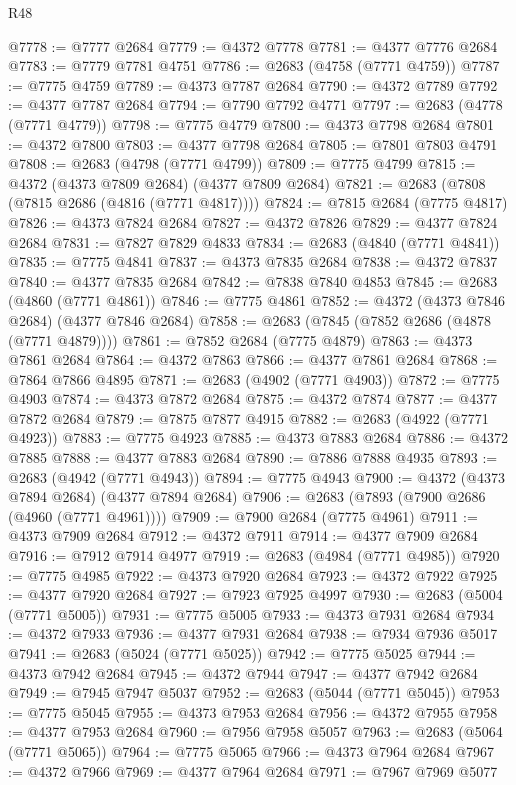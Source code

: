 \begin{lexlean}{R48}
\begin{coremodule}
@7778 := @7777 @2684
@7779 := @4372 @7778
@7781 := @4377 @7776 @2684
@7783 := @7779 @7781 @4751
@7786 := @2683 (@4758 (@7771 @4759))
@7787 := @7775 @4759
@7789 := @4373 @7787 @2684
@7790 := @4372 @7789
@7792 := @4377 @7787 @2684
@7794 := @7790 @7792 @4771
@7797 := @2683 (@4778 (@7771 @4779))
@7798 := @7775 @4779
@7800 := @4373 @7798 @2684
@7801 := @4372 @7800
@7803 := @4377 @7798 @2684
@7805 := @7801 @7803 @4791
@7808 := @2683 (@4798 (@7771 @4799))
@7809 := @7775 @4799
@7815 := @4372 (@4373 @7809 @2684) (@4377 @7809 @2684)
@7821 := @2683 (@7808 (@7815 @2686 (@4816 (@7771 @4817))))
@7824 := @7815 @2684 (@7775 @4817)
@7826 := @4373 @7824 @2684
@7827 := @4372 @7826
@7829 := @4377 @7824 @2684
@7831 := @7827 @7829 @4833
@7834 := @2683 (@4840 (@7771 @4841))
@7835 := @7775 @4841
@7837 := @4373 @7835 @2684
@7838 := @4372 @7837
@7840 := @4377 @7835 @2684
@7842 := @7838 @7840 @4853
@7845 := @2683 (@4860 (@7771 @4861))
@7846 := @7775 @4861
@7852 := @4372 (@4373 @7846 @2684) (@4377 @7846 @2684)
@7858 := @2683 (@7845 (@7852 @2686 (@4878 (@7771 @4879))))
@7861 := @7852 @2684 (@7775 @4879)
@7863 := @4373 @7861 @2684
@7864 := @4372 @7863
@7866 := @4377 @7861 @2684
@7868 := @7864 @7866 @4895
@7871 := @2683 (@4902 (@7771 @4903))
@7872 := @7775 @4903
@7874 := @4373 @7872 @2684
@7875 := @4372 @7874
@7877 := @4377 @7872 @2684
@7879 := @7875 @7877 @4915
@7882 := @2683 (@4922 (@7771 @4923))
@7883 := @7775 @4923
@7885 := @4373 @7883 @2684
@7886 := @4372 @7885
@7888 := @4377 @7883 @2684
@7890 := @7886 @7888 @4935
@7893 := @2683 (@4942 (@7771 @4943))
@7894 := @7775 @4943
@7900 := @4372 (@4373 @7894 @2684) (@4377 @7894 @2684)
@7906 := @2683 (@7893 (@7900 @2686 (@4960 (@7771 @4961))))
@7909 := @7900 @2684 (@7775 @4961)
@7911 := @4373 @7909 @2684
@7912 := @4372 @7911
@7914 := @4377 @7909 @2684
@7916 := @7912 @7914 @4977
@7919 := @2683 (@4984 (@7771 @4985))
@7920 := @7775 @4985
@7922 := @4373 @7920 @2684
@7923 := @4372 @7922
@7925 := @4377 @7920 @2684
@7927 := @7923 @7925 @4997
@7930 := @2683 (@5004 (@7771 @5005))
@7931 := @7775 @5005
@7933 := @4373 @7931 @2684
@7934 := @4372 @7933
@7936 := @4377 @7931 @2684
@7938 := @7934 @7936 @5017
@7941 := @2683 (@5024 (@7771 @5025))
@7942 := @7775 @5025
@7944 := @4373 @7942 @2684
@7945 := @4372 @7944
@7947 := @4377 @7942 @2684
@7949 := @7945 @7947 @5037
@7952 := @2683 (@5044 (@7771 @5045))
@7953 := @7775 @5045
@7955 := @4373 @7953 @2684
@7956 := @4372 @7955
@7958 := @4377 @7953 @2684
@7960 := @7956 @7958 @5057
@7963 := @2683 (@5064 (@7771 @5065))
@7964 := @7775 @5065
@7966 := @4373 @7964 @2684
@7967 := @4372 @7966
@7969 := @4377 @7964 @2684
@7971 := @7967 @7969 @5077

\end{coremodule}
\end{lexlean}

